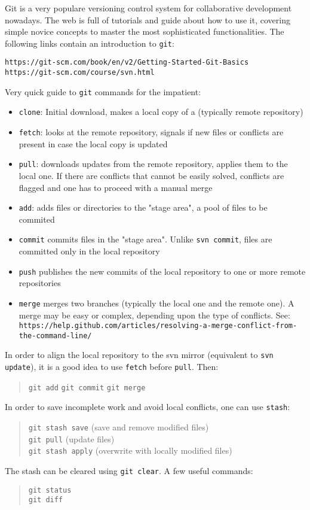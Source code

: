 \documentclass[12pt,a4paper]{article}
\begin{document}
Git is a very populare versioning control system for collaborative development 
nowadays. The web is full of tutorials and guide about how to use it, covering 
simple novice concepts to master the most sophisticated functionalities. The 
following links contain an introduction to \texttt{git}:
\begin{verbatim}
https://git-scm.com/book/en/v2/Getting-Started-Git-Basics
https://git-scm.com/course/svn.html
\end{verbatim}
Very quick guide to \texttt{git} commands for the impatient:
\begin{itemize}
\item
  \texttt{clone}: Initial download, makes a local copy of a (typically
  remote repository)
\item  \texttt{fetch}:
  looks at the remote repository, signals if new files or conflicts are present
  in case the local copy is updated
\item  \texttt{pull}:
  downloads updates from the remote repository, applies them to the local one.
  If there are conflicts that cannot be easily solved, conflicts are flagged
  and one has to proceed with a manual merge
\item \texttt{add}: adds files or directories to the "stage area", a pool
  of files to be commited
\item \texttt{commit} commits files in the "stage area". Unlike
  \texttt{svn commit}, files are committed only in the local repository
\item \texttt{push} publishes the new commits of the local repository
  to one or more remote repositories
\item \texttt{merge} merges two branches (typically the local one and
  the remote one). A merge may be easy or complex, depending upon the type of
  conflicts. See:
  \texttt{https://help.github.com/articles/resolving-a-merge-conflict-from-the-command-line/}
\end{itemize}
In order to align the local repository to the svn mirror (equivalent to
\texttt{svn update}), it is a good idea to use \texttt{fetch} before
\texttt{pull}. Then:
\begin{quote}
  \texttt{git add}
  \texttt{git commit}
  \texttt{git merge}
\end{quote}
In order to save incomplete work and avoid local conflicts, one can use
\texttt{stash}:
\begin{quote}
  \texttt{git stash save}     (save and remove modified files)\\
  \texttt{git pull}           (update files)\\
  \texttt{git stash apply}    (overwrite with locally modified files)
\end{quote}
The stash can be cleared using \texttt{git clear}. A few useful commands:
\begin{quote}
  \texttt{git status}\\
  \texttt{git diff}
\end{quote}
\end{document}
